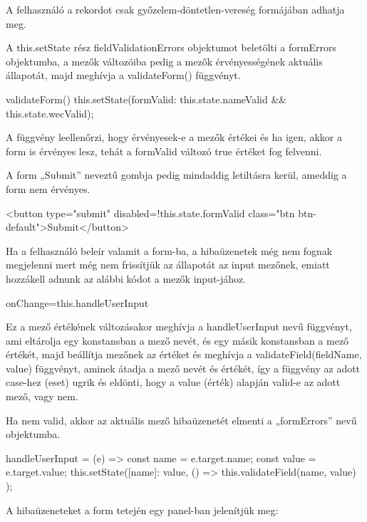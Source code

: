 A felhasználó a rekordot csak győzelem-döntetlen-vereség formájában adhatja meg.

A this.setState rész fieldValidationErrors objektumot beletölti a formErrors objektumba, a mezők változóiba pedig a mezők érvényességének aktuális állapotát, majd meghívja a validateForm() függvényt.

\begin{cpp}
validateForm() {
 this.setState({formValid: this.state.nameValid && this.state.wecValid});
}
\end{cpp}

A függvény leellenőrzi, hogy érvényesek-e a mezők értékei és ha igen, akkor a form is érvényes lesz, tehát a formValid változó true értéket fog felvenni.

A form „Submit” neveztű gombja pedig mindaddig letiltásra kerül, ameddig a form nem érvényes.

\begin{cpp}
<button type="submit" disabled={!this.state.formValid} 
class="btn btn-default">Submit</button>
\end{cpp}

Ha a felhasználó beleír valamit a form-ba, a hibaüzenetek még nem fognak megjelenni mert még nem frissítjük az állapotát az input mezőnek, emiatt hozzákell adnunk az alábbi kódot a mezők input-jához.

\begin{cpp}
onChange={this.handleUserInput}
\end{cpp}

Ez a mező értékének változásakor meghívja a handleUserInput nevű függvényt, ami eltárolja egy konstansban a mező nevét, és egy másik konstansban a mező értékét, majd beállítja mezőnek az értéket és meghívja a validateField(fieldName, value) függvényt, aminek átadja a mező nevét és értékét, így a függvény az adott case-hez (eset) ugrik és eldönti, hogy a value (érték) alapján valid-e az adott mező, vagy nem.

Ha nem valid, akkor az aktuális mező hibaüzenetét elmenti a „formErrors” nevű objektumba.

\begin{cpp}
handleUserInput = (e) => {
    const name = e.target.name;
    const value = e.target.value;
    this.setState({[name]: value},
                  () => { this.validateField(name, value) }); }
\end{cpp}

A hibaüzeneteket a form tetején egy panel-ban jelenítjük meg:

